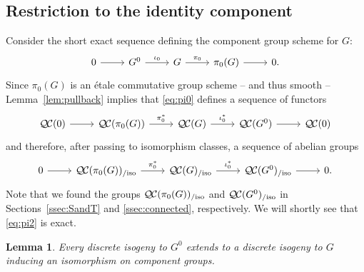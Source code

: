 \documentclass[10pt]{amsart}
\theoremstyle{plain}
\newtheorem{lemma}[theorem]{Lemma}
\theoremstyle{definition}
\theoremstyle{remark}
\newcommand{\QC}{{\mathcal{Q\hskip-0.8pt C}}}
\newcommand{\QCiso}[1]{\QC(#1)_{/\text{iso}}}
\begin{document}
\subsection{Restriction to the identity component} \label{ssec:restriction}

Consider the short exact sequence
defining the component group scheme for $G$:
\begin{equation}\label{eq:pi0}
\begin{tikzcd}
0 \rar & G^0 \arrow{r}{\iota_0} & G \arrow{r}{\pi_0} & \pi_0(G) \rar & 0.
\end{tikzcd}
\end{equation}
Since $\pi_0(G)$ is an \'etale commutative group scheme -- and thus smooth --
Lemma~\ref{lem:pullback} implies that \eqref{eq:pi0} defines a sequence of functors
\begin{equation}\label{eq:pi1}
\begin{tikzcd}
\QC(0) \rar & \QC(\pi_0(G)) \arrow{r}{\pi_0^*} & \QC(G) \arrow{r}{\iota_0^*} & \QC(G^0) \rar & \QC(0)
\end{tikzcd}
\end{equation}
and therefore, after passing to isomorphism classes, a sequence of abelian groups
\begin{equation}\label{eq:pi2}
\begin{tikzcd}
0 \rar &
\QCiso{\pi_0(G)} \arrow{r}{\pi_0^*} & \QCiso{G} \arrow{r}{\iota_0^*} & \QCiso{G^0} \rar & 0.
\end{tikzcd}
\end{equation}
 Note that we found the groups $\QCiso{\pi_0(G)}$ and $\QCiso{G^0}$
in Sections~\ref{ssec:SandT} and \ref{ssec:connected}, respectively.
We will shortly see that \eqref{eq:pi2} is exact.


\begin{lemma}\label{lemma:ext}
Every discrete isogeny to $G^0$ extends to a discrete
isogeny to $G$ inducing an isomorphism on component groups.
\end{lemma}
\end{document}
